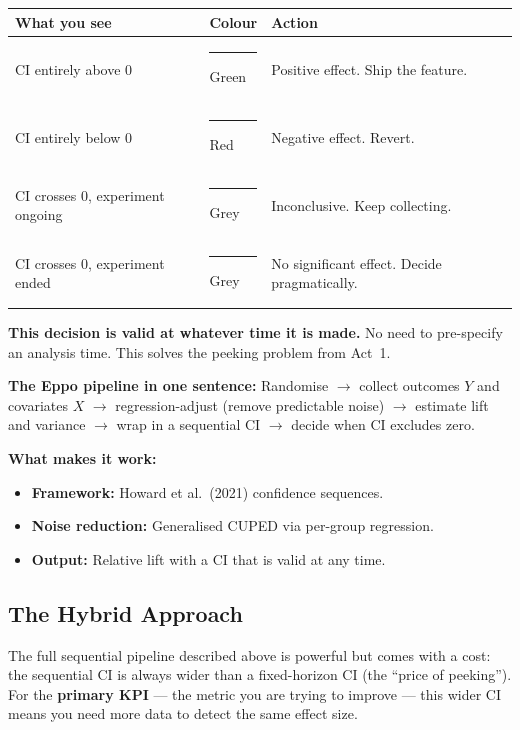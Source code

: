 \documentclass[12pt, a4paper]{article}
\begin{document}
\begin{center}
\renewcommand{\arraystretch}{1.3}
\begin{tabular}{@{} l l p{6.5cm} @{}}
\toprule
\textbf{What you see} & \textbf{Colour} & \textbf{Action} \\
\midrule
CI entirely above 0
  & \textcolor{green!60!black}{\rule{1em}{1em}} Green
  & Positive effect.  Ship the feature. \\
CI entirely below 0
  & \textcolor{red}{\rule{1em}{1em}} Red
  & Negative effect.  Revert. \\
CI crosses 0, experiment ongoing
  & \textcolor{gray}{\rule{1em}{1em}} Grey
  & Inconclusive.  Keep collecting. \\
CI crosses 0, experiment ended
  & \textcolor{gray}{\rule{1em}{1em}} Grey
  & No significant effect.  Decide pragmatically. \\
\bottomrule
\end{tabular}
\end{center}

\textbf{This decision is valid at whatever time it is made.}  No need to
pre-specify an analysis time.  This solves the peeking problem from Act~1.

\begin{keytakeaway}
\textbf{The Eppo pipeline in one sentence:}
Randomise $\to$ collect outcomes $Y$ and covariates $X$ $\to$
regression-adjust (remove predictable noise) $\to$ estimate lift and variance
$\to$ wrap in a sequential CI $\to$ decide when CI excludes zero.

\textbf{What makes it work:}
\begin{itemize}[nosep]
  \item \textbf{Framework:} Howard et al.\ (2021) confidence sequences.
  \item \textbf{Noise reduction:} Generalised CUPED via per-group regression.
  \item \textbf{Output:} Relative lift with a CI that is valid at any time.
\end{itemize}
\end{keytakeaway}


\subsection{The Hybrid Approach}

The full sequential pipeline described above is powerful but comes with a
cost: the sequential CI is always wider than a fixed-horizon CI (the ``price
of peeking'').  For the \textbf{primary KPI} --- the metric you are trying to
improve --- this wider CI means you need more data to detect the same effect
size.
\end{document}
